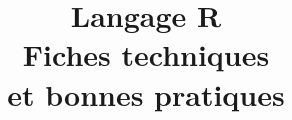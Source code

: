 \renewcommand{\maketitle}
{\begingroup
\AlCentroPagina{resources/Rlogo_grey3}
\parbox[b][0.95\textheight][t]{0.2\textwidth}{\raggedleft\logoInsee \\ \logoutilitR} 
\hspace*{2ex}
\textcolor{OxfordBlue}{\rule{2pt}{0.95\textheight}}
\hspace*{2ex}
\parbox[b][0.95\textheight][t]{0.8\textwidth}{
    \setlength{\parindent}{0pt}
    \sffamily
    {\Huge\bfseries{\begin{spacing}{1.15}\textcolor{OxfordBlue}{\@title}\end{spacing}}}
    \vspace*{2ex}
    {\large\textit{\tagline}}\\[1in]
    {\Huge \bfseries \textsc{\project}} \\[1cm]
    {\large  \doctype\ \public}\\
    \vfill
    {\bfseries \dateversion}\\[\baselineskip]
    \parbox[t]{0.80\linewidth}{\footnotesize\textit{Réalisé par \groupe}.}   
}
\thispagestyle{empty}
\if@openright\cleardoublepage\else\clearpage\fi
\endgroup
  }
\makeatother

\usepackage{courier}

\title{Langage R\\ Fiches techniques\\et bonnes pratiques}  
\newcommand{\tagline}{Guide pratique à l'usage des statisticiens}
\newcommand{\project}{Projet \texttt{utilitR}}
\newcommand{\doctype}{Une documentation collaborative}
\newcommand{\public}{pour les agents de l'Insee}
\newcommand{\groupe}{la communauté \texttt{R} de l'Insee}
\newcommand{\dateversion}{Septembre 2020 - Version 1.0}

     



\usepackage[color=red!50, angle=60, fontsize = 0.13\paperwidth]{draftwatermark}



